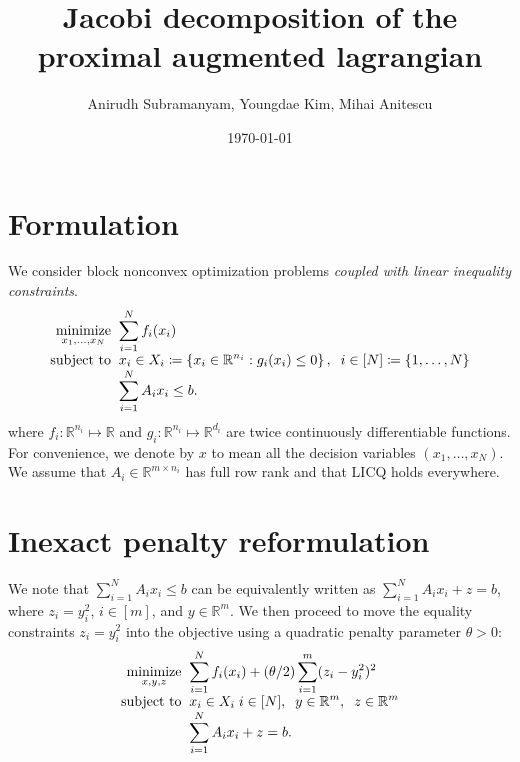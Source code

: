 \documentclass[11pt]{article}
\title{Jacobi decomposition of the proximal augmented lagrangian}
\author{Anirudh Subramanyam, Youngdae Kim, Mihai Anitescu}
\date{\today}
\begin{document}
\maketitle

\section{Formulation}
We consider block nonconvex optimization problems \textit{coupled with linear inequality constraints}.
\begin{equation}\label{eq:nlp}
\begin{array}{r@{\;\;}l}
\displaystyle\mathop{\text{minimize}}_{x_1, \ldots, x_N} & \displaystyle \sum_{i = 1}^N f_i(x_i) \\
\text{subject to}
& \displaystyle x_i \in X_i \coloneqq \left\{
x_i \in \mathbb{R}^{n_i} : 
g_i(x_i) \leq 0
\right\}, \;\; i \in [N] \coloneqq \{1, \ldots, N\} \\
& \displaystyle \sum_{i = 1}^N A_i x_i \leq b.
\end{array}
\end{equation}
where $f_i: \mathbb{R}^{n_i} \mapsto \mathbb{R}$ and $g_i :\mathbb{R}^{n_i} \mapsto \mathbb{R}^{d_i}$ are twice continuously differentiable functions.
For convenience, we denote by $x$ to mean all the decision variables $(x_1, \ldots, x_N)$.
We assume that $A_i \in \mathbb{R}^{m \times n_i}$ has full row rank and that LICQ holds everywhere.

\section{Inexact penalty reformulation}
We note that $\sum_{i = 1}^N A_i x_i \leq b$ can be equivalently written as $\sum_{i = 1}^N A_i x_i + z =  b$, where $z_i = y^2_i$, $i \in [m]$, and $y \in \mathbb{R}^m$.
We then proceed to move the equality constraints $z_i = y^2_i$ into the objective using a quadratic penalty parameter $\theta > 0$:
\begin{equation}\label{eq:penalty}
\begin{array}{r@{\;\;}l}
\displaystyle\mathop{\text{minimize}}_{x, y, z} & \displaystyle \sum_{i = 1}^N f_i(x_i) + (\theta/2) \sum_{i = 1}^m (z_i - y_i^2)^2 \\
\text{subject to}
& \displaystyle x_i \in X_i \; i \in [N], \;\; y \in \mathbb{R}^m, \;\; z \in \mathbb{R}^m \\
& \displaystyle \sum_{i = 1}^N A_i x_i + z = b.
\end{array}
\end{equation}
\end{document}
